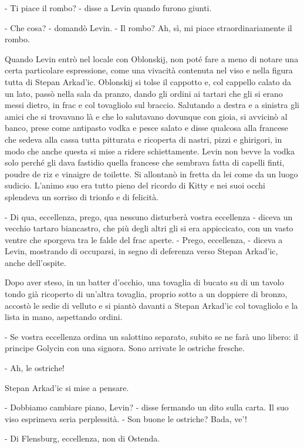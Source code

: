 - Ti piace il rombo? - disse a Levin quando furono giunti. 

- Che cosa? - domandò Levin. - Il rombo? Ah, sì, mi piace straordinariamente il rombo. 
\enlargethispage{1\baselineskip}

Quando Levin entrò nel locale con Oblonskij, non poté fare a meno di notare una certa particolare espressione, come una vivacità contenuta nel viso e nella figura tutta di Stepan Arkad'ic. Oblonskij si tolse il cappotto e, col cappello calato da un lato, passò nella sala da pranzo, dando gli ordini ai tartari che gli si erano messi dietro, in frac e col tovagliolo sul braccio. Salutando a destra e a sinistra gli amici che si trovavano là e che lo salutavano dovunque con gioia, si avvicinò al banco, prese come antipasto vodka e pesce salato e disse qualcosa alla francese che sedeva alla cassa tutta pitturata e ricoperta di nastri, pizzi e ghirigori, in modo che anche questa si mise a ridere schiettamente. Levin non bevve la vodka solo perché gli dava fastidio quella francese che sembrava fatta di capelli finti, poudre de riz e vinaigre de toilette. Si allontanò in fretta da lei come da un luogo sudicio. L'animo suo era tutto pieno del ricordo di Kitty e nei suoi occhi splendeva un sorriso di trionfo e di felicità. 

- Di qua, eccellenza, prego, qua nessuno disturberà vostra eccellenza - diceva un vecchio tartaro biancastro, che più degli altri gli si era appiccicato, con un vasto ventre che sporgeva tra le falde del frac aperte. - Prego, eccellenza, - diceva a Levin, mostrando di occuparsi, in segno di deferenza verso Stepan Arkad'ic, anche dell'ospite. 

Dopo aver steso, in un batter d'occhio, una tovaglia di bucato su di un tavolo tondo già ricoperto di un'altra tovaglia, proprio sotto a un doppiere di bronzo, accostò le sedie di velluto e si piantò davanti a Stepan Arkad'ic col tovagliolo e la lista in mano, aspettando ordini. 

- Se vostra eccellenza ordina un salottino separato, subito se ne farà uno libero: il principe Golycin con una signora. Sono arrivate le ostriche fresche. 

- Ah, le ostriche! 

Stepan Arkad'ic si mise a pensare. 

- Dobbiamo cambiare piano, Levin? - disse fermando un dito sulla carta. Il suo viso esprimeva seria perplessità. - Son buone le ostriche? Bada, ve'! 

- Di Flensburg, eccellenza, non di Ostenda. 


